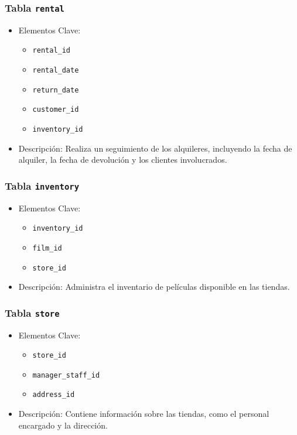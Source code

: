 \documentclass[10pt]{report}
\begin{document}
		\subsubsection{Tabla \texttt{rental}}
		\begin{itemize}
		  \item Elementos Clave:
		  \begin{itemize}
			\item \texttt{rental\_id}
			\item \texttt{rental\_date}
			\item \texttt{return\_date}
			\item \texttt{customer\_id}
			\item \texttt{inventory\_id}
		  \end{itemize}
		  \item Descripción: Realiza un seguimiento de los alquileres, incluyendo la fecha de alquiler, la fecha de devolución y los clientes involucrados.
		\end{itemize}
		
		\subsubsection{Tabla \texttt{inventory}}
		\begin{itemize}
		  \item Elementos Clave:
		  \begin{itemize}
			\item \texttt{inventory\_id}
			\item \texttt{film\_id}
			\item \texttt{store\_id}
		  \end{itemize}
		  \item Descripción: Administra el inventario de películas disponible en las tiendas.
		\end{itemize}
		
		\subsubsection{Tabla \texttt{store}}
		\begin{itemize}
		  \item Elementos Clave:
		  \begin{itemize}
			\item \texttt{store\_id}
			\item \texttt{manager\_staff\_id}
			\item \texttt{address\_id}
		  \end{itemize}
		  \item Descripción: Contiene información sobre las tiendas, como el personal encargado y la dirección.
		\end{itemize}
		
\end{document}
